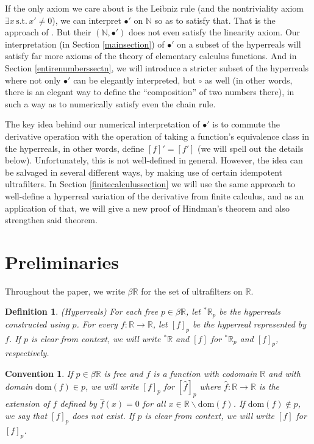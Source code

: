 \documentclass[microtype]{jloganal}
\newtheorem{definition}[theorem]{Definition}
\newtheorem{convention}[theorem]{Convention}
\begin{document}
If the only axiom we care about is the
Leibniz rule (and the nontriviality axiom $\exists x\,\mbox{s.t.}\,x'\not=0$),
we can interpret $\bullet'$
on $\mathbb N$ so as to satisfy that. That is the approach of
\cite{barbeau1961remarks,ufnarovski2003differentiate}.
But their $(\mathbb N,\bullet')$ does not even satisfy the
linearity axiom. Our interpretation (in Section \ref{mainsection})
of $\bullet'$ on a subset of the hyperreals
will satisfy far more axioms of the theory of elementary calculus functions.
And in Section \ref{entirenumberssectn},
we will introduce a stricter subset of the hyperreals where
not only $\bullet'$ can be elegantly interpreted, but $\circ$ as well
(in other words, there is an elegant way to define the ``composition'' of
two numbers there),
in such a way as to numerically satisfy even the chain rule.

The key idea behind our numerical interpretation of $\bullet'$ is to
commute the derivative
operation with the operation of taking a function's equivalence class in the
hyperreals, in other words, define $[f]'=[f']$ (we will spell out the details below). Unfortunately, this is not well-defined in general. However, the idea
can be salvaged in several different ways, by making use of certain idempotent ultrafilters. In Section \ref{finitecalculussection} we will use the same
approach to well-define a hyperreal variation of the derivative from finite
calculus, and as an application of that, we will give a new proof of Hindman's
theorem and also strengthen said theorem.

\section{Preliminaries}

Throughout the paper, we write $\beta\mathbb R$ for the set of ultrafilters on
$\mathbb R$.

\begin{definition}
\label{hyperrealsdefn}
(Hyperreals)
For each free $p\in\beta\mathbb R$, let ${}^*\mathbb R_p$
be the hyperreals constructed using $p$. For every $f:\mathbb R\to\mathbb R$,
let $[f]_p$ be the hyperreal represented by $f$. If $p$ is clear from
context, we will write ${}^*\mathbb R$ and $[f]$ for ${}^*\mathbb R_p$
and $[f]_p$, respectively.
\end{definition}

\begin{convention}
\label{undefdconvention}
If $p\in\beta\mathbb R$ is free and $f$ is a function with codomain
$\mathbb R$ and with domain $\mathrm{dom}(f)\in p$, we will write
$[f]_p$ for $[\hat f]_p$ where $\hat f:\mathbb R\to\mathbb R$
is the extension of $f$ defined by
$\hat f(x)=0$ for all $x\in\mathbb R\backslash\mathrm{dom}(f)$.
If $\mathrm{dom}(f)\not\in p$, we say that $[f]_p$ \emph{does not exist}.
If $p$ is clear from context, we will write $[f]$ for $[f]_p$.
\end{convention}
\end{document}
